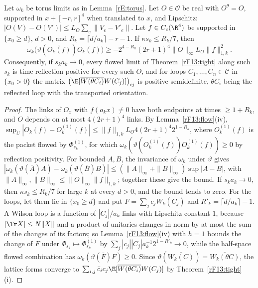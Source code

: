 \begin{proposition}\label{rF13:approx}
Let $\omega_k$ be torus limits as in Lemma~\textup{\ref{rE:torus}}. Let
$O\in\mathcal O$ be real with $O^\theta=O$, supported in $x+[-r,r]^4$
when translated to $x$, and Lipschitz: $|O(V)-O(V')|\le L_O\sum_e\|V_e-V'_e\|$.
Let $f\in C_c(\R^4)$ be supported in $\{x_0\ge d\}$, $d>0$, and $R_k=\lceil d/
a_k\rceil-r-1$. If $\kappa s_k\le R_k/7$, then
\[
\omega_k\bigl(\vartheta(\overline{O_k(f)})O_k(f)\bigr)\ge-2^{4-R_k}(2r+1)^4
\|O\|_\infty L_O\|f\|_{1,k}^2 .
\]
Consequently, if $s_ka_k\to0$, every flowed limit of
Theorem~\textup{\ref{rF13:tight}} along such $s_k$ is time reflection
positive for every such $O$, and for loops $C_1,\dots,C_n\in\mathcal C$ in
$\{x_0>0\}$ the matrix $\bigl(\E[\overline{W(\theta C_i)}W(C_j)]\bigr)_{ij}$
is positive semidefinite, $\theta C_i$ being the reflected loop with the
transported orientation.
\end{proposition}

\begin{proof}
The links of $O_x$ with $f(a_kx)\ne0$ have both endpoints at times $\ge
1+R_k$, and $O$ depends on at most $4(2r+1)^4$ links. By
Lemma~\ref{rF13:flow}(iv), $\sup_U|O_k(f)-O^{(1)}_k(f)|\le\|f\|_{1,k}L_O4(2r+1)^4
2^{1-R_k}$, where $O^{(1)}_k(f)$ is the packet flowed by $\Phi^{(1)}_{s_k}$,
for which $\omega_k(\vartheta(\overline{O^{(1)}_k(f)})O^{(1)}_k(f))\ge0$ by
reflection positivity. For bounded $A,B$, the invariance of $\omega_k$ under
$\vartheta$ gives $|\omega_k(\vartheta(\bar A)A)-\omega_k(\vartheta(\bar B)B)|\le
(\|A\|_\infty+\|B\|_\infty)\sup|A-B|$, with $\|A\|_\infty,\|B\|_\infty\le\|O\|_\infty
\|f\|_{1,k}$; together these give the bound. If $s_ka_k\to0$, then $\kappa
s_k\le R_k/7$ for large $k$ at every $d>0$, and the bound tends to zero. For
the loops, let them lie in $\{x_0\ge d\}$ and put $F=\sum_jc_jW_k(C_j)$ and
$R'_k=\lceil d/a_k\rceil-1$. A Wilson loop is a function of $|C_j|/a_k$
links with Lipschitz constant $1$, because $|\Tr X|\le N\|X\|$ and a product
of unitaries changes in norm by at most the sum of the changes of its
factors; so Lemma~\ref{rF13:flow}(iv) with $h=1$ bounds the change of $F$
under $\Phi_{s_k}\mapsto\Phi^{(1)}_{s_k}$ by $\sum_j|c_j||C_j|a_k^{-1}2^{1-R'_k}
\to0$, while the half-space flowed combination has
$\omega_k(\vartheta(\bar F)F)\ge0$. Since $\vartheta(\overline{W_k(C)})=
\overline{W_k(\theta C)}$, the lattice forms converge to $\sum_{i,j}\bar c_i
c_j\E[\overline{W(\theta C_i)}W(C_j)]$ by Theorem~\ref{rF13:tight}(i).
\end{proof}

